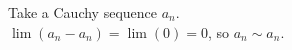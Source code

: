 \documentclass[preview]{standalone}
\begin{document}
\begin{center}
Take a Cauchy sequence $a_n$.\\$\lim (a_n - a_n) = \lim (0) = 0$, so $a_n \sim a_n$.
\end{center}
\end{document}
